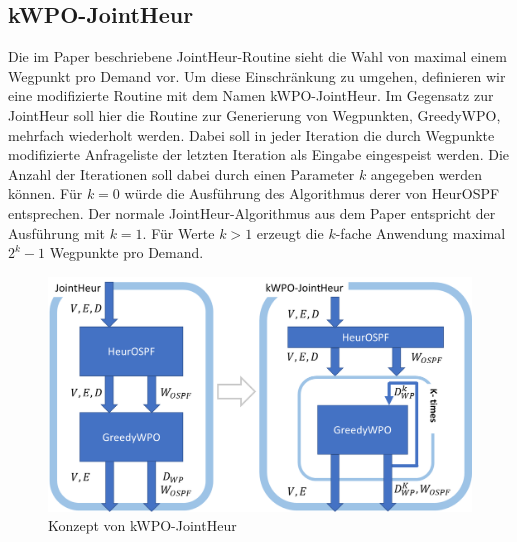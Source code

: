 \documentclass[sigconf,noacm,review]{acmart}
\begin{document}
\subsection{kWPO-JointHeur}
Die im Paper beschriebene JointHeur-Routine sieht die Wahl von maximal einem Wegpunkt pro Demand vor. Um diese Einschränkung zu umgehen, definieren wir eine modifizierte Routine mit dem Namen kWPO-JointHeur. Im Gegensatz zur JointHeur soll hier die Routine zur Generierung von Wegpunkten, GreedyWPO, mehrfach wiederholt werden. Dabei soll in jeder Iteration die durch Wegpunkte modifizierte Anfrageliste der letzten Iteration als Eingabe eingespeist werden. 
Die Anzahl der Iterationen soll dabei durch einen Parameter $k$ angegeben werden können. Für $k = 0$ würde die Ausführung des Algorithmus derer von HeurOSPF entsprechen. Der normale JointHeur-Algorithmus aus dem Paper entspricht der Ausführung mit $k=1$. Für Werte $k > 1$ erzeugt die $k$-fache Anwendung maximal $2^{k}-1$ Wegpunkte pro Demand.
\begin{figure}[h]
  \centering 
  \includegraphics[width=\linewidth]{abbildungen/kWPO_Concept.png}
  \caption{Konzept von kWPO-JointHeur}
\end{figure}
\end{document}
